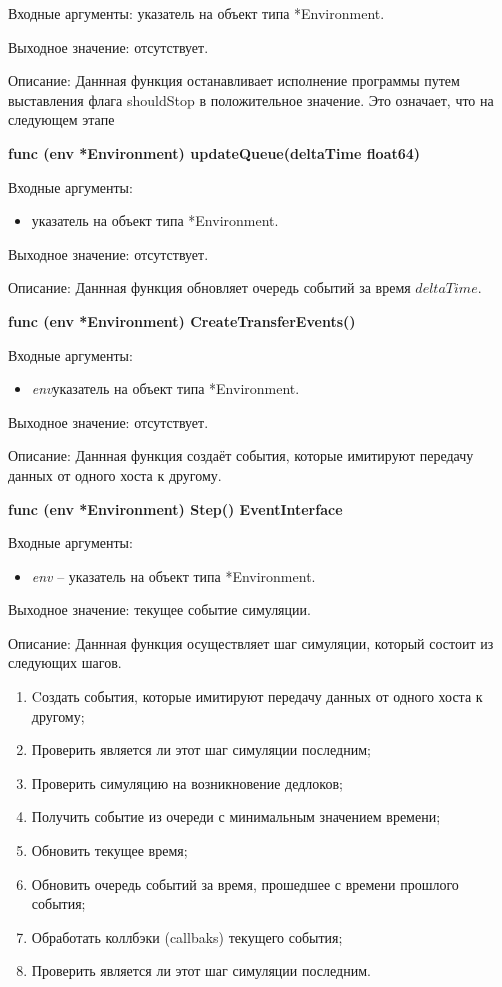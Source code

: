 Входные аргументы: указатель на объект типа *Environment.

Выходное значение: отсутствует.

Описание: Даннная функция останавливает исполнение программы путем выставления флага shouldStop в положительное значение. Это означает, что на следующем этапе 

\textbf{func (env *Environment) updateQueue(deltaTime float64) }

Входные аргументы: 
\begin{itemize}
	\item указатель на объект типа *Environment.
\end{itemize}
Выходное значение: отсутствует.

Описание: Даннная функция обновляет очередь событий за время $deltaTime$. 

\textbf{func (env *Environment) CreateTransferEvents()}

Входные аргументы: 
\begin{itemize}
	\item \textit{env}указатель на объект типа *Environment.
\end{itemize}
Выходное значение: отсутствует.

Описание: Даннная функция создаёт события, которые имитируют передачу данных от одного хоста к другому.

\textbf{func (env *Environment) Step() EventInterface }

Входные аргументы: 
\begin{itemize}
	\item \textit{env} -- указатель на объект типа *Environment.
\end{itemize}

Выходное значение: текущее событие симуляции.

Описание: Даннная функция осуществляет шаг симуляции, который состоит из следующих шагов. 
\begin{enumerate}
	\item Cоздать события, которые имитируют передачу данных от одного хоста к другому;
	\item Проверить является ли этот шаг симуляции последним;
	\item Проверить симуляцию на возникновение дедлоков;
	\item Получить событие из очереди с минимальным значением времени;
	\item Обновить текущее время;
	\item Обновить очередь событий за время, прошедшее с времени прошлого события;
	\item Обработать коллбэки (callbaks) текущего события;
	\item Проверить является ли этот шаг симуляции последним.
	
\end{enumerate}

